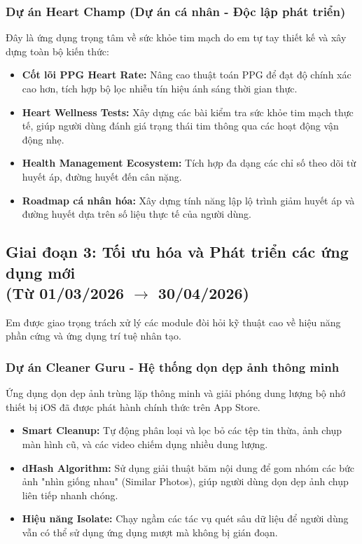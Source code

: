 \documentclass[12pt, a4paper]{article}
\begin{document}
\subsubsection{Dự án Heart Champ (Dự án cá nhân - Độc lập phát triển)}
Đây là ứng dụng trọng tâm về sức khỏe tim mạch do em tự tay thiết kế và xây dựng toàn bộ kiến thức:
\begin{itemize}
    \item \textbf{Cốt lõi PPG Heart Rate:} Nâng cao thuật toán PPG để đạt độ chính xác cao hơn, tích hợp bộ lọc nhiễu tín hiệu ánh sáng thời gian thực.
    \item \textbf{Heart Wellness Tests:} Xây dựng các bài kiểm tra sức khỏe tim mạch thực tế, giúp người dùng đánh giá trạng thái tim thông qua các hoạt động vận động nhẹ.
    \item \textbf{Health Management Ecosystem:} Tích hợp đa dạng các chỉ số theo dõi từ huyết áp, đường huyết đến cân nặng.
    \item \textbf{Roadmap cá nhân hóa:} Xây dựng tính năng lập lộ trình giảm huyết áp và đường huyết dựa trên số liệu thực tế của người dùng.
\end{itemize}

\subsection[Giai đoạn 3: Tối ưu hóa và Phát triển các ứng dụng mới (Từ 01/03/2026 đến 30/04/2026)]{Giai đoạn 3: Tối ưu hóa và Phát triển các ứng dụng mới \\(Từ 01/03/2026 $\rightarrow$ 30/04/2026)}
Em được giao trọng trách xử lý các module đòi hỏi kỹ thuật cao về hiệu năng phần cứng và ứng dụng trí tuệ nhân tạo.
\subsubsection{Dự án Cleaner Guru - Hệ thống dọn dẹp ảnh thông minh}
Ứng dụng dọn dẹp ảnh trùng lặp thông minh và giải phóng dung lượng bộ nhớ thiết bị iOS đã được phát hành chính thức trên App Store.
\begin{itemize}
    \item \textbf{Smart Cleanup:} Tự động phân loại và lọc bỏ các tệp tin thừa, ảnh chụp màn hình cũ, và các video chiếm dụng nhiều dung lượng.
    \item \textbf{dHash Algorithm:} Sử dụng giải thuật băm nội dung để gom nhóm các bức ảnh "nhìn giống nhau" (Similar Photos), giúp người dùng dọn dẹp ảnh chụp liên tiếp nhanh chóng.
    \item \textbf{Hiệu năng Isolate:} Chạy ngầm các tác vụ quét sâu dữ liệu để người dùng vẫn có thể sử dụng ứng dụng mượt mà không bị gián đoạn.
\end{itemize}
\end{document}
